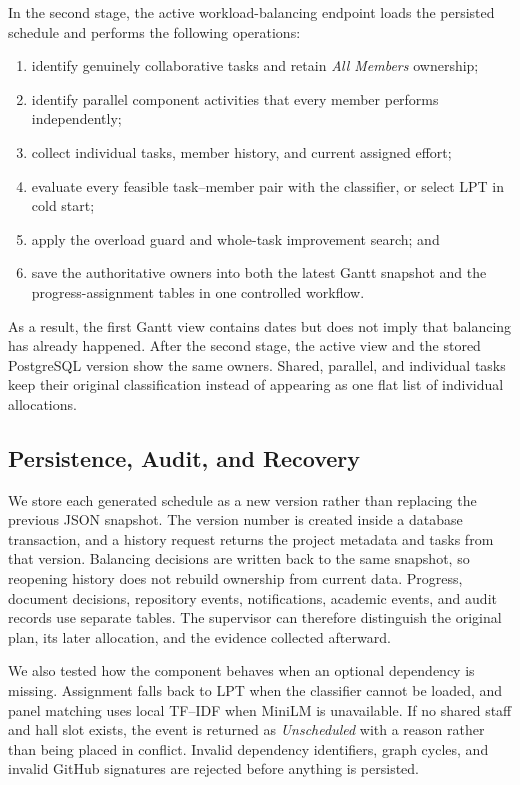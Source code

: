 \documentclass[conference]{IEEEtran}
\begin{document}
In the second stage, the active workload-balancing endpoint loads the persisted schedule and performs the following operations:
\begin{enumerate}
    \item identify genuinely collaborative tasks and retain \emph{All Members} ownership;
    \item identify parallel component activities that every member performs independently;
    \item collect individual tasks, member history, and current assigned effort;
    \item evaluate every feasible task--member pair with the classifier, or select LPT in cold start;
    \item apply the overload guard and whole-task improvement search; and
    \item save the authoritative owners into both the latest Gantt snapshot and the progress-assignment tables in one controlled workflow.
\end{enumerate}
As a result, the first Gantt view contains dates but does not imply that balancing has already happened. After the second stage, the active view and the stored PostgreSQL version show the same owners. Shared, parallel, and individual tasks keep their original classification instead of appearing as one flat list of individual allocations.

\subsection{Persistence, Audit, and Recovery}
We store each generated schedule as a new version rather than replacing the previous JSON snapshot. The version number is created inside a database transaction, and a history request returns the project metadata and tasks from that version. Balancing decisions are written back to the same snapshot, so reopening history does not rebuild ownership from current data. Progress, document decisions, repository events, notifications, academic events, and audit records use separate tables. The supervisor can therefore distinguish the original plan, its later allocation, and the evidence collected afterward.

We also tested how the component behaves when an optional dependency is missing. Assignment falls back to LPT when the classifier cannot be loaded, and panel matching uses local TF--IDF when MiniLM is unavailable. If no shared staff and hall slot exists, the event is returned as \emph{Unscheduled} with a reason rather than being placed in conflict. Invalid dependency identifiers, graph cycles, and invalid GitHub signatures are rejected before anything is persisted.
\end{document}
